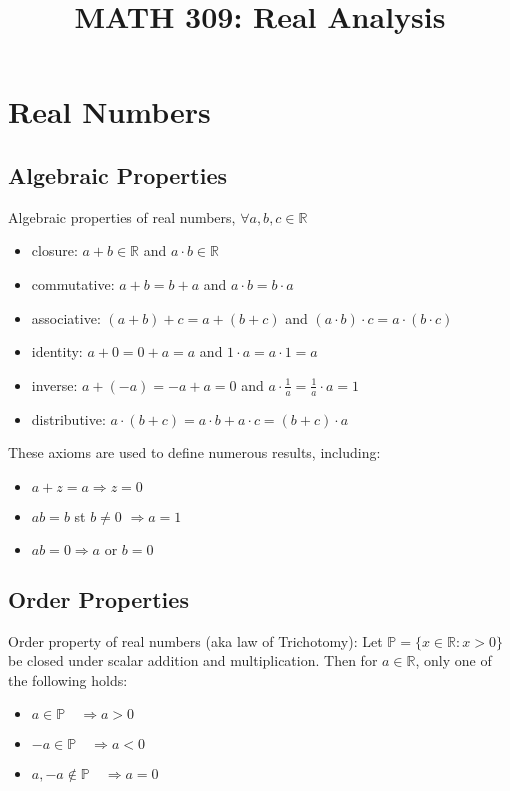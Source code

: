 \documentclass{article}
\title{MATH 309: Real Analysis}
\date{}
\begin{document}
\maketitle

\tableofcontents

\break

\section{Real Numbers}

\subsection{Algebraic Properties}

Algebraic properties of real numbers, $\forall a,b,c \in \mathbb{R}$
\begin{itemize}
	\item closure: $a+b \in \mathbb{R}$ and $a \cdot b \in \mathbb{R}$
	\item commutative: $a+b = b+a$ and $a \cdot b = b \cdot a$
	\item associative: $(a+b)+c = a+(b+c)$ and $(a \cdot b) \cdot c = a \cdot (b \cdot c)$
	\item identity: $a+0 = 0+a = a$ and $1 \cdot a = a \cdot 1 = a$
	\item inverse: $a+(-a) = -a+a=0$ and $a \cdot \frac{1}{a} = \frac{1}{a} \cdot a = 1$
	\item distributive: $a \cdot (b+c) = a \cdot b + a \cdot c = (b+c) \cdot a$
\end{itemize}

These axioms are used to define numerous results, including:
\begin{itemize}
	\item $a+z=a \Rightarrow z = 0$
	\item $ab=b$ st $b\not=0$ $\Rightarrow a=1$
	\item $ab=0 \Rightarrow a \text{ or } b = 0$
\end{itemize}

\subsection{Order Properties}

Order property of real numbers (aka law of Trichotomy): Let $\mathbb{P} = \{x \in \mathbb{R}: x > 0\}$ be closed under scalar addition and multiplication. Then for $a \in \mathbb{R}$, only one of the following holds:
\begin{itemize}
	\item $a\in \mathbb{P} \quad \Rightarrow a > 0$
	\item $-a \in \mathbb{P} \quad \Rightarrow a < 0$
	\item $a, -a \not\in \mathbb{P} \quad \Rightarrow a = 0$
\end{itemize}
\end{document}

